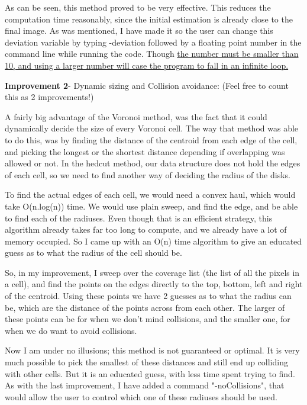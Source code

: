 \documentclass[11pt]{article}
\begin{document}
As can be seen, this method proved to be very effective. This reduces the computation time reasonably, since the initial estimation is already close to the final image. As was mentioned, I have made it so the user can change this deviation variable by typing -deviation followed by a floating point number in the command line while running the code. Though \underline{the number must be smaller than 10, and using a larger number will case the program to fall in an infinite loop.}

\textbf{Improvement 2}- Dynamic sizing and Collision avoidance: (Feel free to count this as 2 improvements!)

A fairly big advantage of the Voronoi method, was the fact that it could dynamically decide the size of every Voronoi cell. The way that method was able to do this, was by finding the distance of the centroid from each edge of the cell, and picking the longest or the shortest distance depending if overlapping was allowed or not. In the hedcut method, our data structure does not hold the edges of each cell, so we need to find another way of deciding the radius of the disks. 

To find the actual edges of each cell, we would need a convex haul, which would take O(n.log(n)) time. We would use plain sweep, and find the edge, and be able to find each of the radiuses. Even though that is an efficient strategy, this algorithm already takes far too long to compute, and we already have a lot of memory occupied. So I came up with an O(n) time algorithm to give an educated guess as to what the radius of the cell should be. 

So, in my improvement, I sweep over the coverage list (the list of all the pixels in a cell), and find the points on the edges directly to the top, bottom, left and right of the centroid. Using these points we have 2 guesses as to what the radius can be, which are the distance of the points across from each other. The larger of these points can be for when we don't mind collisions, and the smaller one, for when we do want to avoid collisions. 

Now I am under no illusions; this method is not guaranteed or optimal. It is very much possible to pick the smallest of these distances and still end up colliding with other cells. But it is an educated guess, with less time spent trying to find. As with the last improvement, I have added a command "-noCollisions", that would allow the user to control which one of these radiuses should be used.
\end{document}
